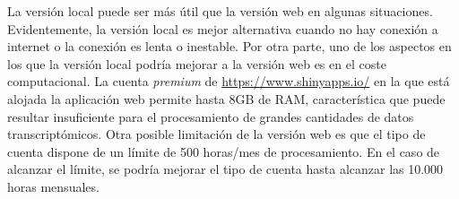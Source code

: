La versión local puede ser más útil que la versión web en algunas situaciones. Evidentemente, la versión local es mejor alternativa cuando no hay conexión a internet o la conexión es lenta o inestable. Por otra parte, uno de los aspectos en los que la versión local podría mejorar a la versión web es en el coste computacional. La cuenta \textit{premium} de \url{https://www.shinyapps.io/} en la que está alojada la aplicación web permite hasta 8GB de RAM, característica que puede resultar insuficiente para el procesamiento de grandes cantidades de datos transcriptómicos. Otra posible limitación de la versión web es que el tipo de cuenta dispone de un límite de 500 horas/mes de procesamiento. En el caso de alcanzar el límite, se podría mejorar el tipo de cuenta hasta alcanzar las 10.000 horas mensuales. 